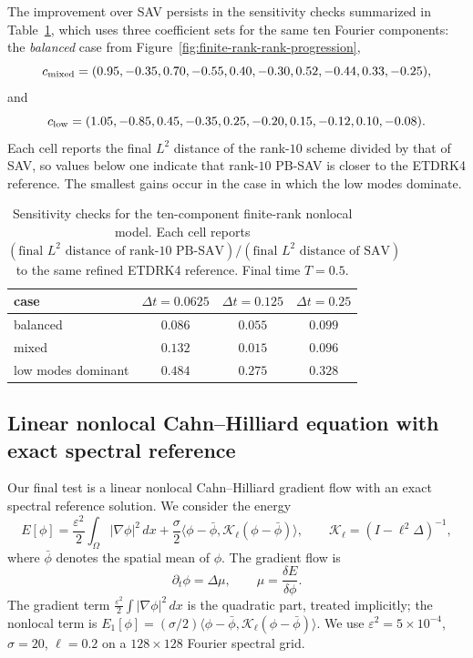 \documentclass[10pt,onefignum,onetabnum,hidelinks]{siamart251216}
\begin{document}
The improvement over SAV persists in the sensitivity checks summarized in Table~\ref{tab:finite-rank-robustness}, which uses three coefficient sets for the same ten Fourier components: the \emph{balanced} case from Figure~\ref{fig:finite-rank-rank-progression},
\[
c_{\rm mixed}
=(0.95,-0.35,0.70,-0.55,0.40,-0.30,0.52,-0.44,0.33,-0.25),
\]
and
\[
c_{\rm low}
=(1.05,-0.85,0.45,-0.35,0.25,-0.20,0.15,-0.12,0.10,-0.08).
\]
Each cell reports the final $L^2$ distance of the rank-$10$ scheme divided by that of SAV, so values below one indicate that rank-$10$ PB-SAV is closer to the ETDRK4 reference. The smallest gains occur in the case in which the low modes dominate.

\begin{table}[tbp]
\centering
\small
\caption{Sensitivity checks for the ten-component finite-rank nonlocal model. Each cell reports \((\text{final }L^2\text{ distance of rank-}10\text{ PB-SAV})/(\text{final }L^2\text{ distance of SAV})\) to the same refined ETDRK4 reference. Final time \(T=0.5\).}
\label{tab:finite-rank-robustness}
\begin{tabular}{lccc}
\toprule
case & \(\Delta t=0.0625\) & \(\Delta t=0.125\) & \(\Delta t=0.25\) \\
\midrule
balanced & $0.086$ & $0.055$ & $0.099$ \\
mixed & $0.132$ & $0.015$ & $0.096$ \\
low modes dominant & $0.484$ & $0.275$ & $0.328$ \\
\bottomrule
\end{tabular}
\end{table}

\subsection{Linear nonlocal Cahn--Hilliard equation with exact spectral reference}
\label{subsec:exp-ch-nonlocal}

Our final test is a linear nonlocal Cahn--Hilliard gradient flow with an exact spectral reference solution.  We consider the energy
\begin{equation}
E[\phi]
=
\frac{\varepsilon^2}{2}\int_\Omega|\nabla\phi|^2\,dx
+
\frac{\sigma}{2}\langle\phi-\bar\phi,\mathcal K_\ell(\phi-\bar\phi)\rangle,
\qquad
\mathcal K_\ell=(I-\ell^2\Delta)^{-1},
\label{eq:s6-ch-energy}
\end{equation}
where $\bar\phi$ denotes the spatial mean of $\phi$.
The gradient flow is
\[
\partial_t\phi=\Delta\mu,\qquad \mu=\frac{\delta E}{\delta\phi}.
\]
The gradient term $\tfrac{\varepsilon^2}{2}\int|\nabla\phi|^2\,dx$ is the quadratic part, treated implicitly; the nonlocal term is $E_1[\phi]=(\sigma/2)\langle\phi-\bar\phi,\mathcal K_\ell(\phi-\bar\phi)\rangle$. We use $\varepsilon^2=5\times10^{-4}$, $\sigma=20$, $\ell=0.2$ on a $128\times128$ Fourier spectral grid.
\end{document}
